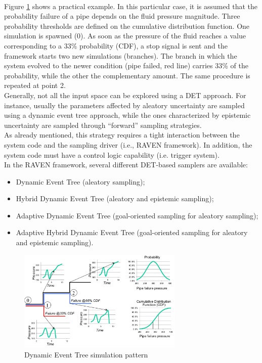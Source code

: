 \\Figure \ref{fig:DETschemeExample} shows a practical example. In this particular case, it is assumed that the
probability failure of a pipe depends on the fluid pressure magnitude. Three probability thresholds are defined on
the cumulative distribution function. One simulation is spawned (0). As soon as the pressure of the fluid reaches a
value corresponding to a 33\% probability (CDF), a stop signal is sent and the framework starts two new
simulations (branches). The branch in which the system evolved to the newer condition (pipe failed, red line)
carries 33\% of the probability, while the other the complementary amount. The same procedure is repeated at
point 2.
\\Generally, not all the input space can be explored using a DET approach. For instance, usually the parameters affected 
by aleatory uncertainty are sampled using a dynamic event tree approach, while the ones characterized by epistemic 
uncertainty are sampled through ``forward'' sampling strategies.
\\As already mentioned, this strategy requires a tight interaction between the system code and the sampling driver (i.e., 
RAVEN framework). In addition, the system code must have a control logic capability (i.e. trigger system).  
\\In the RAVEN framework, several different DET-based samplers are available:
\begin{itemize}
\item Dynamic Event Tree (aleatory sampling);
\item Hybrid Dynamic Event Tree (aleatory and epistemic sampling);
\item Adaptive Dynamic Event Tree (goal-oriented sampling for aleatory sampling);
\item Adaptive Hybrid Dynamic Event Tree (goal-oriented sampling for aleatory and epistemic sampling).
\end{itemize}

\begin{figure}
  \centering
  \includegraphics[width=0.7\textwidth]  {pics/DETscheme.png}
  \caption{Dynamic Event Tree simulation pattern}
  \label{fig:DETschemeExample}
\end{figure}

